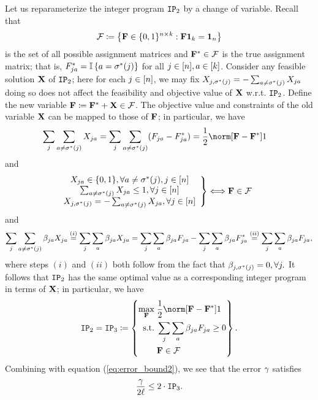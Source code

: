 Let us reparameterize the integer program $\textup{\texttt{IP}}_{2}$ by a change of
variable. Recall that 
\[
\mathcal{F}\coloneqq\left\{ \mathbf{F}\in\{0,1\}^{n\times k}:\mathbf{F}\mathbf{1}_{k}=\mathbf{1}_{n}\right\} 
\]
is the set of all possible assignment matrices and $\mathbf{F}^{*}\in\mathcal{F}$
is the true assignment matrix; that is, $F_{ja}^{*}=\operatorname*{\mathbb{I}}\left\{ a=\sigma^{*}(j)\right\} $
for all $j\in[n],a\in[k]$. Consider any feasible solution
$\mathbf{X}$ of $\textup{\texttt{IP}}_{2}$; here for each $j\in[n]$, we may fix $X_{j,\sigma^{*}(j)}=-\sum_{a\neq\sigma^{*}(j)}X_{ja}$
\textemdash{} doing so does not affect the feasibility and objective
value of $\mathbf{X}$ w.r.t. $\textup{\texttt{IP}}_{2}$. Define the new variable $\mathbf{F}\coloneqq\mathbf{F}^{*}+\mathbf{X}\in\mathcal{F}$.
The objective value and constraints of the old variable $\mathbf{X}$ can
be mapped to those of $\mathbf{F}$; in particular, we have 
\begin{align*}
\sum_{j}\sum_{a\ne\labelstar(j)}X_{ja} & =\sum_{j}\sum_{a\ne\labelstar(j)}(F_{ja}-F_{ja}^{*})=\frac{1}{2}\norm[\F-\F^{*}]1
\end{align*}
and
\begin{align*}
\left.\begin{array}{c}
X_{ja}\in\{0,1\},\forall a\ne\sigma^{*}(j),j\in\left[n\right]\\
\sum_{a\ne\sigma^{*}(j)}X_{ja}\leq1,\forall j\in\left[n\right]\\
X_{j,\sigma^{*}(j)}=-\sum_{a\neq\sigma^{*}(j)}X_{ja},\forall j\in[n]
\end{array}\right\}  & \Longleftrightarrow\mathbf{F}\in\mathcal{F}
\end{align*}
and
\[
\sum_{j}\sum_{a\ne\sigma^{*}(j)}\beta_{ja}X_{ja}\overset{(i)}{=}\sum_{j}\sum_{a}\beta_{ja}X_{ja}=\sum_{j}\sum_{a}\beta_{ja}F_{ja}-\sum_{j}\sum_{a}\beta_{ja}F_{ja}^{*}\overset{(ii)}{=}\sum_{j}\sum_{a}\beta_{ja}F_{ja},
\]
where steps $(i)$ and $(ii)$ both follow from the fact that $\beta_{j,\sigma^{*}(j)}=0,\forall j.$
It follows that $\textup{\texttt{IP}}_{2}$ has the same optimal value as a corresponding
integer program in terms of $\mathbf{X}$; in particular, we have
\[
\IP_{2}=\IP_{3}\coloneqq\left\{ \begin{aligned}\max_{\F}\; & \frac{1}{2}\norm[\F-\F^{*}]1\\
\text{s.t.}\; & \sum_{j}\sum_{a}\beta_{ja}F_{ja}\ge0\\
 & \F\in\mathcal{F}
\end{aligned}
\right\} .
\]
Combining with equation (\ref{eq:error_bound2}), we see that the
error $\gamma$ satisfies
\begin{equation}
\frac{\gamma}{2\ell}\le2\cdot\textup{\texttt{IP}}_{3}.\label{eq:error_bound3}
\end{equation}

